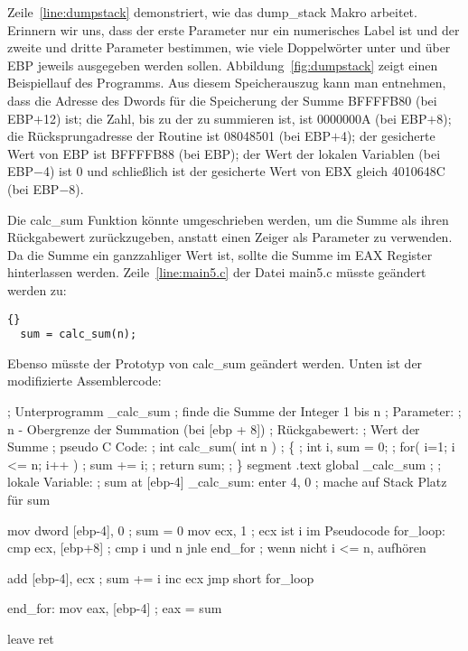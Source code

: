 Zeile~\ref{line:dumpstack} demonstriert, wie das {\code dump\_stack}
Makro arbeitet. Erinnern wir uns, dass der erste Parameter nur ein
numerisches Label ist und der zweite und dritte Parameter bestimmen,
wie viele Doppelw\"{o}rter unter und \"{u}ber EBP jeweils ausgegeben werden
sollen. Abbildung~\ref{fig:dumpstack} zeigt einen Beispiellauf des
Programms. Aus diesem Speicherauszug kann man entnehmen, dass die
Adresse des Dwords f\"{u}r die Speicherung der Summe BFFFFB80 (bei
EBP$+$12) ist; die Zahl, bis zu der zu summieren ist, ist 0000000A
(bei EBP$+$8); die R\"{u}cksprungadresse der Routine ist 08048501 (bei
EBP$+$4); der gesicherte Wert von EBP ist BFFFFB88 (bei EBP); der
Wert der lokalen Variablen (bei EBP$-$4) ist 0 und schlie{\ss}lich ist
der gesicherte Wert von EBX gleich 4010648C (bei EBP$-$8).

Die {\code calc\_sum} Funktion k\"{o}nnte umgeschrieben werden, um die
Summe als ihren R\"{u}ckgabewert zur\"{u}ckzugeben, anstatt einen Zeiger als
Parameter zu verwenden. Da die Summe ein ganzzahliger Wert ist,
sollte die Summe im EAX Register hinterlassen werden.
Zeile~\ref{line:main5.c} der Datei {\code main5.c} m\"{u}sste ge\"{a}ndert
werden zu:
\begin{lstlisting}[stepnumber=0]{}
  sum = calc_sum(n);
\end{lstlisting}
Ebenso m\"{u}sste der Prototyp von {\code calc\_sum} ge\"{a}ndert werden.
Unten ist der modifizierte Assemblercode:
\begin{AsmCodeListing}[label=sub6.asm, numbers=left, commandchars=\\\{\}]
 ; Unterprogramm _calc_sum
 ; finde die Summe der Integer 1 bis n
 ; Parameter:
 ;   n    - Obergrenze der Summation (bei [ebp + 8])
 ; R\"{u}ckgabewert:
 ;   Wert der Summe
 ; pseudo C Code:
 ; int calc_sum( int n )
 ; \{
 ;   int i, sum = 0;
 ;   for( i=1; i <= n; i++ )
 ;     sum += i;
 ;   return sum;
 ; \}
 segment .text
         global  _calc_sum
 ;
 ; lokale Variable:
 ;   sum at [ebp-4]
 _calc_sum:
         enter   4, 0              ; mache auf Stack Platz f\"{u}r sum

         mov     dword [ebp-4], 0  ; sum = 0
         mov     ecx, 1            ; ecx ist i im Pseudocode
 for_loop:
         cmp     ecx, [ebp+8]      ; cmp i und n
         jnle    end_for           ; wenn nicht i <= n, aufh\"{o}ren

         add     [ebp-4], ecx      ; sum += i
         inc     ecx
         jmp     short for_loop

 end_for:
         mov     eax, [ebp-4]      ; eax = sum

         leave
         ret
\end{AsmCodeListing}

